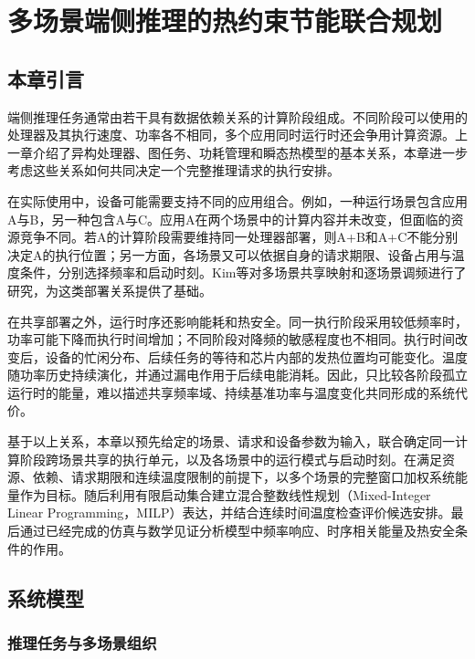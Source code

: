 \chapter{多场景端侧推理的热约束节能联合规划}
\label{ch:joint-thermal}

\section{本章引言}

端侧推理任务通常由若干具有数据依赖关系的计算阶段组成。不同阶段可以使用的处理器及其执行速度、功率各不相同，多个应用同时运行时还会争用计算资源。上一章介绍了异构处理器、图任务、功耗管理和瞬态热模型的基本关系，本章进一步考虑这些关系如何共同决定一个完整推理请求的执行安排。

在实际使用中，设备可能需要支持不同的应用组合。例如，一种运行场景包含应用A与B，另一种包含A与C。应用A在两个场景中的计算内容并未改变，但面临的资源竞争不同。若A的计算阶段需要维持同一处理器部署，则A+B和A+C不能分别决定A的执行位置；另一方面，各场景又可以依据自身的请求期限、设备占用与温度条件，分别选择频率和启动时刻。Kim等对多场景共享映射和逐场景调频进行了研究\cite{kim2023scenario}，为这类部署关系提供了基础。

在共享部署之外，运行时序还影响能耗和热安全。同一执行阶段采用较低频率时，功率可能下降而执行时间增加；不同阶段对降频的敏感程度也不相同。执行时间改变后，设备的忙闲分布、后续任务的等待和芯片内部的发热位置均可能变化。温度随功率历史持续演化，并通过漏电作用于后续电能消耗。因此，只比较各阶段孤立运行时的能量，难以描述共享频率域、持续基准功率与温度变化共同形成的系统代价。

基于以上关系，本章以预先给定的场景、请求和设备参数为输入，联合确定同一计算阶段跨场景共享的执行单元，以及各场景中的运行模式与启动时刻。在满足资源、依赖、请求期限和连续温度限制的前提下，以多个场景的完整窗口加权系统能量作为目标。随后利用有限启动集合建立混合整数线性规划（Mixed-Integer Linear Programming，MILP）表达，并结合连续时间温度检查评价候选安排。最后通过已经完成的仿真与数学见证分析模型中频率响应、时序相关能量及热安全条件的作用。

\section{系统模型}

\subsection{推理任务与多场景组织}

